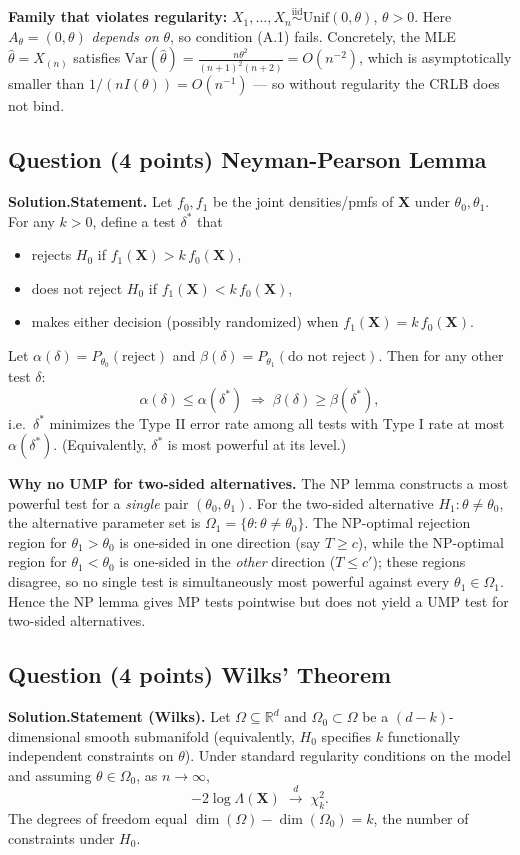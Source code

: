 \documentclass[11pt]{article}
\newcounter{qnum}
\newcommand{\question}[2]{\stepcounter{qnum}\subsection*{Question \theqnum \quad (#1 points) \hfill #2}}
\newcommand{\soln}{\medskip\textbf{Solution.}\quad}
\newcommand{\Var}{\mathrm{Var}}
\newcommand{\bX}{\mathbf{X}}
\begin{document}
\medskip

\textbf{Family that violates regularity:} $X_1,\ldots,X_n \stackrel{\text{iid}}{\sim} \mathrm{Unif}(0,\theta)$, $\theta>0$. Here $A_\theta = (0,\theta)$ \emph{depends on} $\theta$, so condition (A.1) fails. Concretely, the MLE $\hat\theta = X_{(n)}$ satisfies $\Var(\hat\theta) = \frac{n\theta^2}{(n+1)^2(n+2)} = O(n^{-2})$, which is asymptotically smaller than $1/(n I(\theta)) = O(n^{-1})$ --- so without regularity the CRLB does not bind.

\question{4}{Neyman-Pearson Lemma}

\soln \textbf{Statement.} Let $f_0,f_1$ be the joint densities/pmfs of $\bX$ under $\theta_0,\theta_1$. For any $k>0$, define a test $\delta^*$ that
\begin{itemize}[leftmargin=2em,nosep]
    \item rejects $H_0$ if $f_1(\bX) > k\,f_0(\bX)$,
    \item does not reject $H_0$ if $f_1(\bX) < k\,f_0(\bX)$,
    \item makes either decision (possibly randomized) when $f_1(\bX) = k\,f_0(\bX)$.
\end{itemize}
Let $\alpha(\delta) = P_{\theta_0}(\text{reject})$ and $\beta(\delta) = P_{\theta_1}(\text{do not reject})$. Then for any other test $\delta$:
\[
\alpha(\delta) \le \alpha(\delta^*) \;\Longrightarrow\; \beta(\delta) \ge \beta(\delta^*),
\]
i.e.\ $\delta^*$ minimizes the Type II error rate among all tests with Type I rate at most $\alpha(\delta^*)$. (Equivalently, $\delta^*$ is most powerful at its level.)

\medskip

\textbf{Why no UMP for two-sided alternatives.} The NP lemma constructs a most powerful test for a \emph{single} pair $(\theta_0,\theta_1)$. For the two-sided alternative $H_1: \theta \neq \theta_0$, the alternative parameter set is $\Omega_1 = \{\theta : \theta \neq \theta_0\}$. The NP-optimal rejection region for $\theta_1 > \theta_0$ is one-sided in one direction (say $T \ge c$), while the NP-optimal region for $\theta_1 < \theta_0$ is one-sided in the \emph{other} direction ($T \le c'$); these regions disagree, so no single test is simultaneously most powerful against every $\theta_1 \in \Omega_1$. Hence the NP lemma gives MP tests pointwise but does not yield a UMP test for two-sided alternatives.

\question{4}{Wilks' Theorem}

\soln \textbf{Statement (Wilks).} Let $\Omega \subseteq \mathbb{R}^d$ and $\Omega_0 \subset \Omega$ be a $(d-k)$-dimensional smooth submanifold (equivalently, $H_0$ specifies $k$ functionally independent constraints on $\theta$). Under standard regularity conditions on the model and assuming $\theta \in \Omega_0$, as $n\to\infty$,
\[
-2\log \Lambda(\bX) \;\xrightarrow{d}\; \chi^2_k.
\]
The degrees of freedom equal $\dim(\Omega) - \dim(\Omega_0) = k$, the number of constraints under $H_0$.
\end{document}
